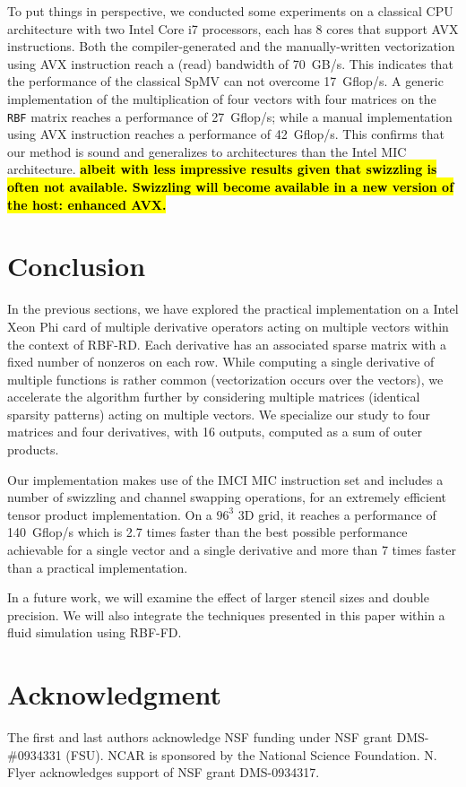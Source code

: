 \documentclass[10pt,conference,compsocconf]{IEEEtran}
\newcommand{\todo}[1]{{\color{red}\textbf{\hl{#1}}\xspace}}
\begin{document}
To put things in perspective, we conducted some experiments on a
classical CPU architecture with two Intel Core i7 processors, each has 8
cores that support AVX instructions. Both the compiler-generated and
the manually-written vectorization using AVX instruction reach a
(read) bandwidth of 70~GB/s. This indicates that the performance of
the classical SpMV can not overcome 17~Gflop/s. A generic
implementation of the multiplication of four vectors with four matrices on
the {\tt RBF} matrix reaches a performance of 27~Gflop/s; while a
manual implementation using AVX instruction reaches a performance of
42~Gflop/s. This confirms that our method is sound and generalizes to
architectures than the Intel MIC architecture. \todo{albeit with less 
impressive results given that swizzling is often not available. Swizzling
will become available in a new version of the host: enhanced AVX.}

\section{Conclusion}
\label{sec:ccl}

In the previous sections, we have explored the practical
implementation on a Intel Xeon Phi card of multiple derivative
operators acting on multiple vectors within the context of
RBF-RD. Each derivative has an associated sparse matrix with a fixed
number of nonzeros on each row. While computing a single derivative of
multiple functions is rather common (vectorization occurs over the
vectors), we accelerate the algorithm further by considering multiple
matrices (identical sparsity patterns) acting on multiple vectors. 
We specialize our study to four matrices and four derivatives,
with 16 outputs, computed as a sum of outer products.

Our implementation makes use of the IMCI MIC instruction set and
includes a number of swizzling and channel swapping operations, for an
extremely efficient tensor product implementation. On a $96^3$ 3D
grid, it reaches a performance of 140~Gflop/s which is 2.7 times
faster than the best possible performance achievable for a single
vector and a single derivative and more than 7 times faster than a
practical implementation.

In a future work, we will examine the effect of larger stencil sizes
and double precision. We will also integrate the techniques
presented in this paper within a fluid simulation using RBF-FD.

\section*{Acknowledgment}
The first and last authors acknowledge NSF funding under NSF grant
DMS-\#0934331 (FSU). NCAR is sponsored by the National Science
Foundation. N. Flyer acknowledges support of NSF grant DMS-0934317.



\end{document}
